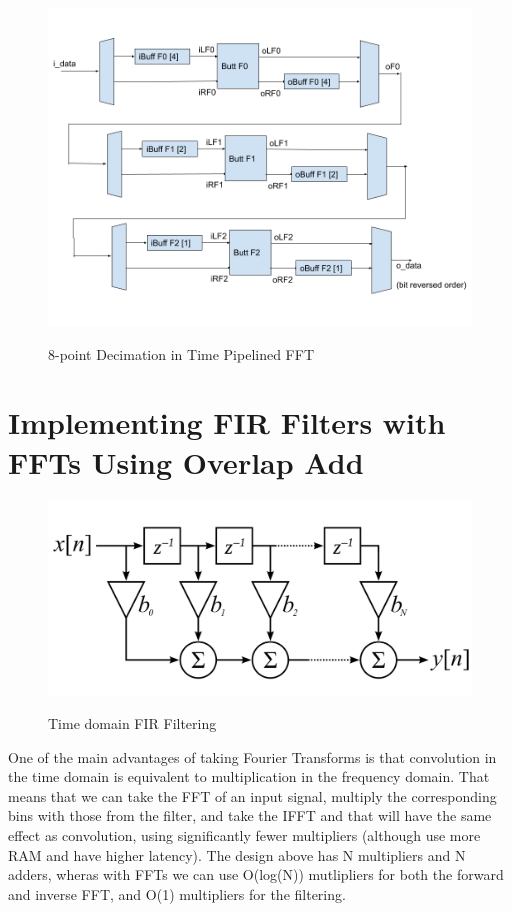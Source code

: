 \documentclass{article}
\begin{document}
  \begin{figure}[h!]
    \centering
    \includegraphics[width=0.8\linewidth]{pipelined_fft.png}
    \label{fig:fft}
    \caption{8-point Decimation in Time Pipelined FFT}
  \end {figure}

\pagebreak

\section{Implementing FIR Filters with FFTs Using Overlap Add}

  \begin{figure}[h!]
    \centering
    \includegraphics[width=0.6\linewidth]{firfilter.png}
    \label{fig:timedomain_fir}
    \caption{Time domain FIR Filtering}
  \end {figure}

One of the main advantages of taking Fourier Transforms is that convolution in the time domain is equivalent to multiplication
in the frequency domain. That means that we can take the FFT of an input signal, multiply the corresponding bins with those from the filter,
and take the IFFT and that will have the same effect as convolution, using significantly fewer multipliers (although use more RAM and have higher latency).
The design above has N multipliers and N adders, wheras with FFTs we can use O(log(N)) mutlipliers for both the forward and inverse FFT, and
O(1) multipliers for the filtering. \\
\end{document}
